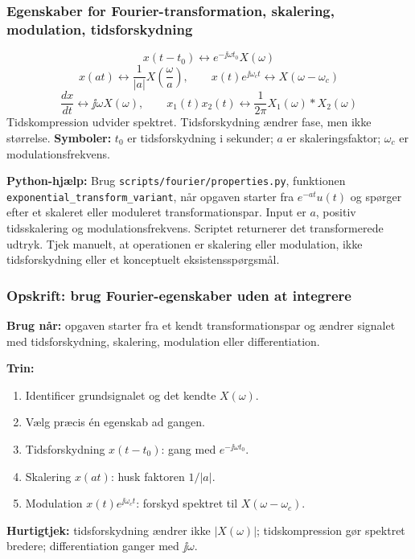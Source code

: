\subsubsection{Egenskaber for Fourier-transformation, skalering, modulation, tidsforskydning}
\[
x(t-t_0)\leftrightarrow e^{-\jj\omega t_0}X(\omega)
\]
\[
x(at)\leftrightarrow \frac{1}{|a|}X\left(\frac{\omega}{a}\right),\qquad
x(t)e^{\jj\omega_ct}\leftrightarrow X(\omega-\omega_c)
\]
\[
\frac{dx}{dt}\leftrightarrow \jj\omega X(\omega),\qquad
x_1(t)x_2(t)\leftrightarrow \frac{1}{2\pi}X_1(\omega)*X_2(\omega)
\]
Tidskompression udvider spektret. Tidsforskydning ændrer fase, men ikke størrelse.
\textbf{Symboler:} \(t_0\) er tidsforskydning i sekunder; \(a\) er skaleringsfaktor; \(\omega_c\) er modulationsfrekvens.

\textbf{Python-hjælp:} Brug \texttt{scripts/fourier/properties.py}, funktionen \texttt{exponential\_transform\_variant}, når opgaven starter fra \(e^{-at}u(t)\) og spørger efter et skaleret eller moduleret transformationspar. Input er \(a\), positiv tidsskalering og modulationsfrekvens. Scriptet returnerer det transformerede udtryk. Tjek manuelt, at operationen er skalering eller modulation, ikke tidsforskydning eller et konceptuelt eksistensspørgsmål.

\subsubsection{Opskrift: brug Fourier-egenskaber uden at integrere}
\textbf{Brug når:} opgaven starter fra et kendt transformationspar og ændrer signalet med tidsforskydning, skalering, modulation eller differentiation.

\textbf{Trin:}
\begin{enumerate}
    \item Identificer grundsignalet og det kendte \(X(\omega)\).
    \item Vælg præcis én egenskab ad gangen.
    \item Tidsforskydning \(x(t-t_0)\): gang med \(e^{-\jj\omega t_0}\).
    \item Skalering \(x(at)\): husk faktoren \(1/|a|\).
    \item Modulation \(x(t)e^{\jj\omega_ct}\): forskyd spektret til \(X(\omega-\omega_c)\).
\end{enumerate}

\textbf{Hurtigtjek:} tidsforskydning ændrer ikke \(|X(\omega)|\); tidskompression gør spektret bredere; differentiation ganger med \(\jj\omega\).

